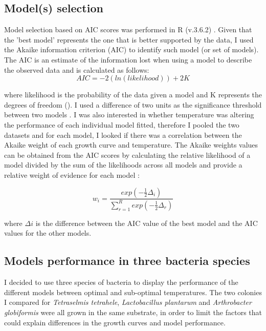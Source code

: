 \documentclass[a4paper]{article}
\begin{document}
    \subsection{Model(s) selection}
    Model selection based on AIC scores was performed in R (v.3.6.2) \citep{Rcit}.\newline
    Given that the 'best model' represents the one that is better supported by the data, I used the Akaike information criterion (AIC) to identify such model (or set of models). The AIC is an estimate of the information lost when using a model to describe the observed data \citep{johnson2004model} and is calculated as follows:
\begin{equation}
\label{eqn:AIC}
AIC = -2 ( ln ( likelihood )) + 2 K
\end{equation}

where likelihood is the probability of the data given a model and K represents the degrees of freedom (\citep{doi:10.1177/0049124104268644}). 
    I used a difference of two units as the significance threshold between two models \citep{doi:10.1177/0049124104268644}. \newline I was also interested in whether temperature was altering the performance of each individual model fitted, therefore I pooled the two datasets and for each model, I looked if there was a correlation between the Akaike weight of each growth curve and temperature. The Akaike weights values can be obtained from the AIC scores by calculating the relative likelihood of a model divided by the sum of the likelihoods across all models and provide a relative weight of evidence for each model \citep{johnson2004model, symonds2011brief}:
    
\begin{equation}
 w_i =\frac{exp(-\frac{1}{2}\Delta _i)}{ \sum_{r=1}^{R} exp(-\frac{1}{2}\Delta _r)}
\end{equation}

    where $\Delta i$ is the difference between the AIC value of the best model and the AIC values for the other models.
    
    \subsection{Models performance in three bacteria species}
    I decided to use three species of bacteria to display the performance of the different models between optimal and sub-optimal temperatures. The two colonies I compared for \textit{Tetraselmis tetrahele}, \textit{Lactobacillus plantarum} and \textit{Arthrobacter globiformis} were all grown in the same substrate, in order to limit the factors that could explain differences in the growth curves and model performance. 
    
\end{document}
